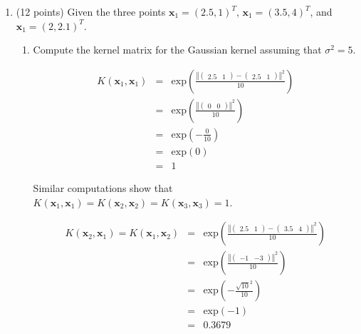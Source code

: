 \documentclass[11pt]{article}
\begin{document}
\begin{enumerate}
\item (12 points) Given the three points $\mathbf{x}_1 = (2.5, 1)^\mathit{T}$, $\mathbf{x}_1 = (3.5, 4)^\mathit{T}$, and $\mathbf{x}_1 = (2, 2.1)^\mathit{T}$.

\begin{enumerate}
\item Compute the kernel matrix for the Gaussian kernel assuming that $\sigma^2 = 5$.

\begin{eqnarray*}
K(\mathbf{x}_1, \mathbf{x}_1) &=& \text{exp} \left( \frac{\left \Vert \left( \begin{array}{cc} 2.5 & 1 \end{array} \right) - \left( \begin{array}{cc} 2.5 & 1 \end{array} \right) \right \Vert^2}{10} \right) \\ \nonumber
&=& \text{exp} \left( \frac{\left \Vert \left( \begin{array}{cc} 0 & 0 \end{array} \right) \right \Vert^2}{10} \right) \\ \nonumber
&=& \text{exp} \left( - \frac{0}{10} \right) \\ \nonumber
&=& \text{exp} \left( 0 \right) \\
&=& 1 \nonumber
\end{eqnarray*}

Similar computations show that $K(\mathbf{x}_1, \mathbf{x}_1) = K(\mathbf{x}_2, \mathbf{x}_2) = K(\mathbf{x}_3, \mathbf{x}_3) = 1$.

\begin{eqnarray*}
K(\mathbf{x}_2, \mathbf{x}_1) = K(\mathbf{x}_1, \mathbf{x}_2) &=& \text{exp} \left( \frac{\left \Vert \left( \begin{array}{cc} 2.5 & 1 \end{array} \right) - \left( \begin{array}{cc} 3.5 & 4 \end{array} \right) \right \Vert^2}{10} \right) \\ \nonumber
&=& \text{exp} \left( \frac{\left \Vert \left( \begin{array}{cc} -1 & -3 \end{array} \right) \right \Vert^2}{10} \right) \\ \nonumber
&=& \text{exp} \left( - \frac{\sqrt{10}^2}{10} \right) \\ \nonumber
&=& \text{exp} \left( -1 \right) \\ \nonumber
&=& 0.3679
\end{eqnarray*}


\end{enumerate}
\end{enumerate}
\end{document}
